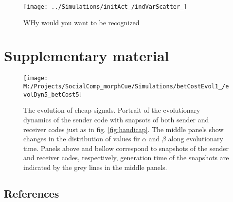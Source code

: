 \documentclass[
  12pt,
]{article}
\newcommand{\beginsupplement}{ \setcounter{table}{0}     \renewcommand{\thetable}{S\arabic{table}}\setcounter{figure}{0} \renewcommand{\thefigure}{S\arabic{figure}}}
\begin{document}
\begin{figure}

{\centering \texttt{[image: ../Simulations/initAct\_/indVarScatter\_]} 

}

\caption{WHy would you want to be recognized}\label{fig:startCond}
\end{figure}

\hypertarget{supplementary-material}{%
\section{Supplementary material}\label{supplementary-material}}

\beginsupplement

\begin{figure}

{\centering \texttt{[image: M:/Projects/SocialComp\_morphCue/Simulations/betCostEvol1\_/evolDyn5\_betCost5]} 

}

\caption{The evolution of cheap signals. Portrait of the evolutionary dynamics of the sender code with snapsots of both sender and receiver codes just as in fig. \ref{fig:handicap}. The middle panels show changes in the distribution of values fir $\alpha$ and $\beta$ along evolutionary time. Panels above and bellow correspond to snapshots of the sender and receiver codes, respectively, generation time of the snapshots are indicated by the grey lines in the middle panels.}\label{fig:noBadge}
\end{figure}

\hypertarget{references}{%
\subsection*{References}\label{references}}
\end{document}
